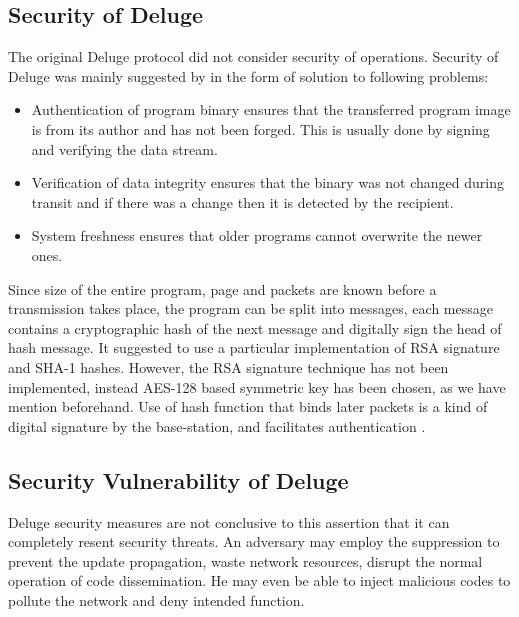 \documentclass[conference,final]{IEEEtran}
\begin{document}
\subsection{Security of Deluge}
The original Deluge protocol did not consider security of operations.
Security of Deluge was mainly suggested by \cite{1127826} in the form of solution to following problems:
\begin{itemize}
\item	Authentication of program binary ensures that the transferred program image is from its author and has not been forged. This is usually done by signing and verifying the data stream.
\item	Verification of data integrity ensures that the binary was not changed during transit and if there was a change then it is detected by the recipient. 
\item 	System freshness ensures that older programs cannot overwrite the newer ones.
\end{itemize}
Since size of the entire program, page and packets are known before a transmission takes place, the program can be split into messages, each message contains a cryptographic hash of the next message and digitally sign the head of hash message.
It suggested to use a particular implementation of RSA signature and SHA-1 hashes.
However, the RSA signature technique has not been implemented, instead AES-128 based symmetric key has been chosen, as we have mention beforehand. 
Use of hash function that binds later packets is a kind of digital signature by the base-station, and  facilitates authentication \cite{1127826}.



\subsection{Security Vulnerability of Deluge}
Deluge security measures are not conclusive to this assertion that it can completely resent security threats. 
An adversary may employ  the suppression to prevent the update propagation, waste network resources, disrupt the normal operation of code dissemination. 
He may even be able to inject malicious codes to pollute the network and deny intended function.
\end{document}
